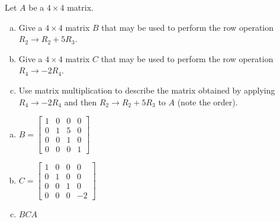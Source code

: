 
\begin{exerciseStatement}


Let \(A\) be a \(4 \times 4\) matrix.


\begin{enumerate}[(a)]
\item Give a \(4 \times 4\) matrix \(B\) that may be used to perform the row operation \( R_2 \to R_2 + 5R_3 \).
\item Give a \(4 \times 4\) matrix \(C\) that may be used to perform the row operation \( R_4 \to -2R_4 \).
\item Use matrix multiplication to describe the matrix obtained by applying \( R_4 \to -2R_4 \) and then \( R_2 \to R_2 + 5R_3 \) to \(A\) (note the order). 
\end{enumerate}
    
\end{exerciseStatement}
    
\begin{exerciseAnswer} 

\begin{enumerate}[(a)]
\item \(B= \left[\begin{array}{cccc}
1 & 0 & 0 & 0 \\
0 & 1 & 5 & 0 \\
0 & 0 & 1 & 0 \\
0 & 0 & 0 & 1
\end{array}\right] \)
\item \(C= \left[\begin{array}{cccc}
1 & 0 & 0 & 0 \\
0 & 1 & 0 & 0 \\
0 & 0 & 1 & 0 \\
0 & 0 & 0 & -2
\end{array}\right] \)
\item \(BCA\)
\end{enumerate}
    
\end{exerciseAnswer}
    

